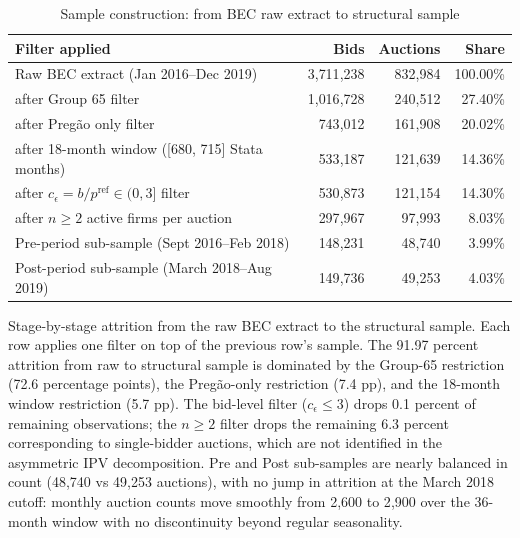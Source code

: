 \begin{table}[htbp]
\centering
\begin{threeparttable}
\caption{Sample construction: from BEC raw extract to structural sample}
\label{tab:sample_flow}
\footnotesize
\setlength{\tabcolsep}{3pt}
\begin{tabular}{lrrr}
\toprule
Filter applied & Bids & Auctions & Share \\
\midrule
Raw BEC extract (Jan 2016--Dec 2019) & 3{,}711{,}238 & 832{,}984 & 100.00\% \\
\quad after Group 65 filter & 1{,}016{,}728 & 240{,}512 & 27.40\% \\
\quad after Preg\~ao only filter & 743{,}012 & 161{,}908 & 20.02\% \\
\quad after 18-month window ([680, 715] Stata months) & 533{,}187 & 121{,}639 & 14.36\% \\
\quad after $c_\epsilon = b/p^{\mathrm{ref}} \in (0, 3]$ filter & 530{,}873 & 121{,}154 & 14.30\% \\
\quad after $n \ge 2$ active firms per auction & 297{,}967 & 97{,}993 & 8.03\% \\
\midrule
Pre-period sub-sample (Sept 2016--Feb 2018) & 148{,}231 & 48{,}740 & 3.99\% \\
Post-period sub-sample (March 2018--Aug 2019) & 149{,}736 & 49{,}253 & 4.03\% \\
\bottomrule
\end{tabular}
\begin{tablenotes}\footnotesize
\item Stage-by-stage attrition from the raw BEC extract to the structural
sample. Each row applies one filter on top of the previous row's sample.
The 91.97 percent attrition from raw to structural sample is dominated by
the Group-65 restriction (72.6 percentage points), the Preg\~ao-only
restriction (7.4 pp), and the 18-month window restriction (5.7 pp).
The bid-level filter ($c_\epsilon \le 3$) drops 0.1 percent of remaining
observations; the $n \ge 2$ filter drops the remaining 6.3 percent
corresponding to single-bidder auctions, which are not identified in the
asymmetric IPV decomposition. Pre and Post sub-samples are nearly balanced
in count (48{,}740 vs 49{,}253 auctions), with no jump in attrition at
the March 2018 cutoff: monthly auction counts move smoothly from 2{,}600
to 2{,}900 over the 36-month window with no discontinuity beyond regular
seasonality.
\end{tablenotes}
\end{threeparttable}
\end{table}
